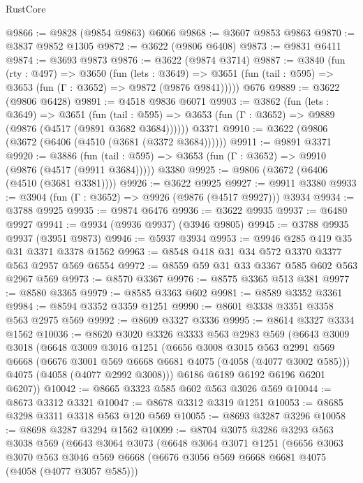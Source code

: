 \begin{lexlean}{RustCore}
\begin{coremodule}
@9866 := @9828 (@9854 @9863) @6066
@9868 := @3607 @9853 @9863
@9870 := @3837 @9852 @1305
@9872 := @3622 (@9806 @6408)
@9873 := @9831 @6411
@9874 := @3693 @9873
@9876 := @3622 (@9874 @3714)
@9887 := @3840
    (fun (rty : @497) =>
    @3650
      (fun (lets : @3649) =>
      @3651 (fun (tail : @595) => @3653 (fun (Γ : @3652) => @9872 (@9876 @9841)))))
    @676
@9889 := @3622 (@9806 @6428)
@9891 := @4518 @9836 @6071
@9903 := @3862
    (fun (lets : @3649) =>
    @3651
      (fun (tail : @595) => @3653 (fun (Γ : @3652) => @9889 (@9876 (@4517 (@9891 @3682 @3684))))))
    @3371
@9910 := @3622 (@9806 (@3672 (@6406 (@4510 (@3681 (@3372 @3684))))))
@9911 := @9891 @3371
@9920 := @3886
    (fun (tail : @595) => @3653 (fun (Γ : @3652) => @9910 (@9876 (@4517 (@9911 @3684)))))
    @3380
@9925 := @9806 (@3672 (@6406 (@4510 (@3681 @3381))))
@9926 := @3622 @9925
@9927 := @9911 @3380
@9933 := @3904 (fun (Γ : @3652) => @9926 (@9876 (@4517 @9927))) @3934
@9934 := @3788 @9925
@9935 := @9874 @6476
@9936 := @3622 @9935
@9937 := @6480 @9927
@9941 := @9934 (@9936 @9937) (@3946 @9805)
@9945 := @3788 @9935 @9937 (@3951 @9873)
@9946 := @5937 @3934
@9953 := @9946 @285 @419 @35 @31 @3371 @3378 @1562
@9963 := @8548 @418 @31 @34 @572 @3370 @3377 @563 @2957 @569 @6554
@9972 := @8559 @59 @31 @33 @3367 @585 @602 @563 @2967 @569
@9973 := @8570 @3367
@9976 := @8575 @3365 @513 @381
@9977 := @8580 @3365
@9979 := @8585 @3363 @602
@9981 := @8589 @3352 @3361
@9984 := @8594 @3352 @3359 @1251
@9990 := @8601 @3338 @3351 @3358 @563 @2975 @569
@9992 := @8609 @3327 @3336
@9995 := @8614 @3327 @3334 @1562
@10036 := @8620
    @3020
    @3326
    @3333
    @563
    @2983
    @569
    (@6643
      @3009
      @3018
      (@6648
        @3009
        @3016
        @1251
        (@6656
          @3008
          @3015
          @563
          @2991
          @569
          @6668
          (@6676 @3001 @569 @6668 @6681 @4075 (@4058 (@4077 @3002 @585)))
          @4075
          (@4058 (@4077 @2992 @3008)))
        @6186
        @6189
        @6192
        @6196
        @6201
        @6207))
@10042 := @8665 @3323 @585 @602 @563 @3026 @569
@10044 := @8673 @3312 @3321
@10047 := @8678 @3312 @3319 @1251
@10053 := @8685 @3298 @3311 @3318 @563 @120 @569
@10055 := @8693 @3287 @3296
@10058 := @8698 @3287 @3294 @1562
@10099 := @8704
    @3075
    @3286
    @3293
    @563
    @3038
    @569
    (@6643
      @3064
      @3073
      (@6648
        @3064
        @3071
        @1251
        (@6656
          @3063
          @3070
          @563
          @3046
          @569
          @6668
          (@6676 @3056 @569 @6668 @6681 @4075 (@4058 (@4077 @3057 @585)))

\end{coremodule}
\end{lexlean}
